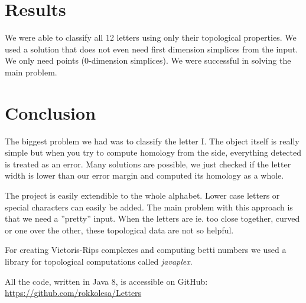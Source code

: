\documentclass{article}
\begin{document}

\section{Results}
We were able to classify all 12 letters using only their topological properties. We used a solution that does not even need first dimension simplices from the input. We only need points (0-dimension simplices). We were successful in solving the main problem.



\section{Conclusion}
The biggest problem we had was to classify the letter I. The object itself is really simple but when you try to compute homology from the side, everything detected is treated as an error. Many solutions are possible, we just checked if the letter width is lower than our error margin and computed its homology as a whole.

The project is easily extendible to the whole alphabet. Lower case letters or special characters can easily be added. The main problem with this approach is that we need a ''pretty'' input. When the letters are ie. too close together, curved or one over the other, these topological data are not so helpful.

For creating Vietoris-Rips complexes and computing betti numbers we used a library for topological computations called \textit{javaplex}.

All the code, written in Java 8, is accessible on GitHub:\\
\url{https://github.com/rokkolesa/Letters}
\end{document}
